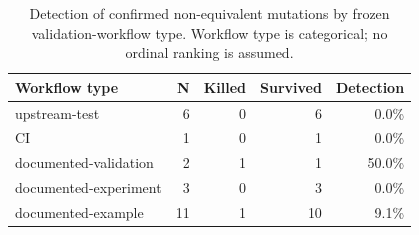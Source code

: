 \begin{table}[t]
\centering
\caption{Detection of confirmed non-equivalent mutations by frozen validation-workflow type. Workflow type is categorical; no ordinal ranking is assumed.}
\label{tab:rq2-workflow}
\begin{tabular}{lrrrr}
\toprule
Workflow type & N & Killed & Survived & Detection \\
\midrule
upstream-test & 6 & 0 & 6 & 0.0\% \\
CI & 1 & 0 & 1 & 0.0\% \\
documented-validation & 2 & 1 & 1 & 50.0\% \\
documented-experiment & 3 & 0 & 3 & 0.0\% \\
documented-example & 11 & 1 & 10 & 9.1\% \\
\bottomrule
\end{tabular}
\end{table}
